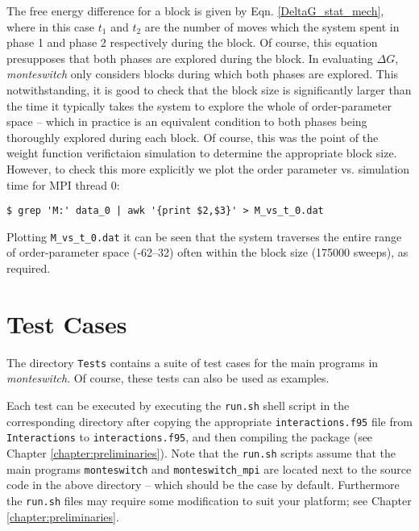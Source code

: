 \documentclass{report}
\begin{document}
The free energy difference for a block is given by Eqn. \eqref{DeltaG_stat_mech}, where in this case $t_1$ and $t_2$ are the number of moves which the 
system spent in phase 1 and phase 2 respectively during the block. Of course, this equation presupposes that both phases are explored during the block. 
In evaluating $\Delta G$, \emph{monteswitch} only considers blocks during which both phases are explored. This notwithstanding, it is good to check that
the block size is significantly larger than the time it typically takes the system to explore the whole of order-parameter space -- which in practice
is an equivalent condition to both phases being thoroughly explored during each block. Of course, this was the point of the weight function verifictaion
simulation to determine the appropriate block size. However, to check this more explicitly we plot the order parameter vs. simulation time for MPI thread 0:
\begin{verbatim}
$ grep 'M:' data_0 | awk '{print $2,$3}' > M_vs_t_0.dat
\end{verbatim}
Plotting \texttt{M\_vs\_t\_0.dat} it can be seen that the system traverses the entire range of order-parameter space (-62--32) often within the block size 
(175000 sweeps), as required.




\chapter{Test Cases}\label{chapter:tests}
The directory \texttt{Tests} contains a suite of test cases for the main programs in \emph{monteswitch}. Of course, these tests can also be used as
examples.

Each test can be executed by executing the \texttt{run.sh} shell script in the corresponding directory after copying the
appropriate \texttt{interactions.f95} file from \texttt{Interactions} to \texttt{interactions.f95}, and then compiling the
package (see Chapter \ref{chapter:preliminaries}). Note that the \texttt{run.sh} scripts assume that the main programs \texttt{monteswitch}
and \texttt{monteswitch\_mpi} are located next to the source code in the above directory -- which should be the case by default. Furthermore
the \texttt{run.sh} files may require some modification to suit your platform; see Chapter \ref{chapter:preliminaries}.
\end{document}
